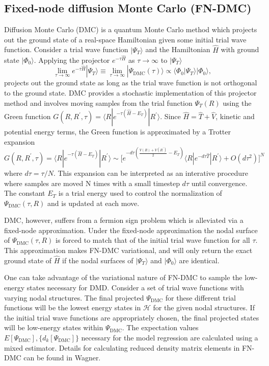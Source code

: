 \documentclass[12pt]{article}
\begin{document}
\subsection{Fixed-node diffusion Monte Carlo (FN-DMC)}
Diffusion Monte Carlo (DMC) is a quantum Monte Carlo method which projects out the ground state of a real-space Hamiltonian given some initial trial wave function.
Consider a trial wave function $|\Psi_T\rangle$ and the Hamiltonian $\hat{H}$ with ground state $|\Phi_0\rangle$. 
Applying the projector $e^{-\tau \hat{H}}$ as $\tau \rightarrow \infty$ to $|\Psi_T \rangle$
\begin{equation}
\lim_{\tau \rightarrow \infty} e^{-\tau \hat{H}} |\Psi_T\rangle 
\equiv \lim_{\tau \rightarrow \infty} |\Psi_\text{DMC}(\tau)\rangle \propto \langle \Phi_0|\Psi_T\rangle |\Phi_0\rangle,
\end{equation}
projects out the ground state as long as the trial wave function is not orthogonal to the ground state. 
DMC provides a stochastic implementation of this projector method and involves moving samples from the trial function $\Psi_T(R)$ using the Green function $G(R, R^\prime, \tau) = \langle R | e^{-\tau(\hat{H} - E_T)} | R^\prime \rangle$. 
Since $\hat{H} = \hat{T} + \hat{V}$, kinetic and potential energy terms, the Green function is approximated by a Trotter expansion 
$$G(R, R^\prime, \tau) = \langle R | e^{-\tau(\hat{H} - E_T)} | R^\prime \rangle \sim \Big[e^{-d\tau(\frac{V(R) + V(R^\prime)}{2} - E_T)} \langle R| e^{-d\tau\hat{T}}|R^\prime \rangle + O(d\tau^2) \Big]^N $$ 
where $d\tau = \tau/N$.
This expansion can be interpreted as an interative procedure where samples are moved N times with a small timestep $d\tau$ until convergence.
The constant $E_T$ is a trial energy used to control the normalization of $\Psi_\text{DMC}(\tau, R)$ and is updated at each move.

DMC, however, suffers from a fermion sign problem which is alleviated via a fixed-node approximation.
Under the fixed-node approximation the nodal surface of $\Psi_\text{DMC}(\tau, R)$ is forced to match that of the initial trial wave function for all $\tau$.
This approximation makes FN-DMC variational, and will only return the exact ground state of $\hat{H}$ if the nodal surfaces of $|\Psi_T\rangle$ and $|\Phi_0\rangle$ are identical.

One can take advantage of the variational nature of FN-DMC to sample the low-energy states necessary for DMD.
Consider a set of trial wave functions with varying nodal structures.
The final projected $\Psi_\text{DMC}$ for these different trial functions will be the lowest energy states in $\mathcal{H}$ for the given nodal structures.
If the initial trial wave functions are appropriately chosen, the final projected states will be low-energy states within $\Psi_\text{DMC}$.
The expectation values $E[\Psi_\text{DMC}], \{d_k[\Psi_\text{DMC}]\}$ necessary for the model regression are calculated using a mixed estimator.
Details for calculating reduced density matrix elements in FN-DMC can be found in Wagner.
\end{document}
